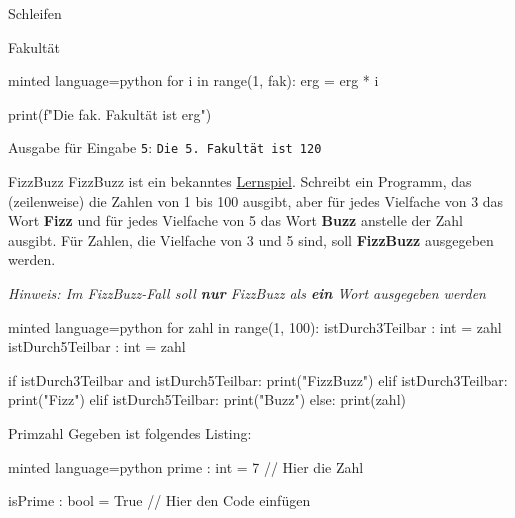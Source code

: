 \begin{task}[points=auto]{Schleifen}
\begin{subtask*}[points=0]{Fakultät }
\begin{solution}
\begin{codeBlock}[]{minted language=python}
            for i in range(1, fak):
                erg = erg * i

            print(f"Die {fak}. Fakultät ist {erg}")
            \end{codeBlock}

            Ausgabe für Eingabe \texttt{5}: \texttt{Die 5. Fakultät ist 120}
        \end{solution}
    \end{subtask*}
    \begin{subtask*}[points=0]{FizzBuzz }
        FizzBuzz ist ein bekanntes \href{https://en.wikipedia.org/wiki/Fizz_buzz}{Lernspiel}. Schreibt ein Programm, das (zeilenweise) die Zahlen von 1 bis 100 ausgibt, aber für jedes Vielfache von 3 das Wort \textbf{Fizz} und für jedes Vielfache von 5 das Wort \textbf{Buzz} anstelle der Zahl ausgibt. Für Zahlen, die Vielfache von 3 und 5 sind, soll \textbf{FizzBuzz} ausgegeben werden.

        \textit{Hinweis: Im FizzBuzz-Fall soll \textbf{nur} FizzBuzz als \textbf{ein} Wort ausgegeben werden}

        \begin{solution}
            \begin{codeBlock}[]{minted language=python}
                for zahl in range(1, 100):
                    istDurch3Teilbar : int = zahl %
                    istDurch5Teilbar : int = zahl %

                    if istDurch3Teilbar and istDurch5Teilbar:
                        print("FizzBuzz")
                    elif istDurch3Teilbar:
                        print("Fizz")
                    elif istDurch5Teilbar:
                        print("Buzz")
                    else:
                        print(zahl)
            \end{codeBlock}
        \end{solution}
    \end{subtask*}
    \begin{subtask*}[points=0]{Primzahl }
        Gegeben ist folgendes Listing:
        \begin{codeBlock}[]{minted language=python}
                prime : int = 7 // Hier die Zahl

                isPrime : bool = True
                // Hier den Code einfügen


\end{codeBlock}
\end{subtask*}
\end{task}
